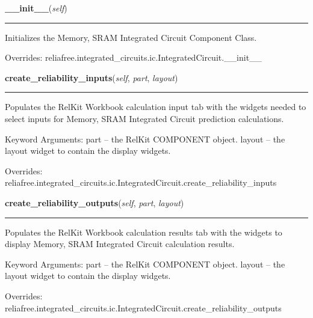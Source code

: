 \hspace{.8\funcindent}\begin{boxedminipage}{\funcwidth}

    \raggedright \textbf{\_\_init\_\_}(\textit{self})

    \vspace{-1.5ex}

    \rule{\textwidth}{0.5\fboxrule}
\setlength{\parskip}{2ex}
    Initializes the Memory, SRAM Integrated Circuit Component Class.

\setlength{\parskip}{1ex}
      Overrides: reliafree.integrated\_circuits.ic.IntegratedCircuit.\_\_init\_\_

    \end{boxedminipage}

    \vspace{0.5ex}

\hspace{.8\funcindent}\begin{boxedminipage}{\funcwidth}

    \raggedright \textbf{create\_reliability\_inputs}(\textit{self}, \textit{part}, \textit{layout})

    \vspace{-1.5ex}

    \rule{\textwidth}{0.5\fboxrule}
\setlength{\parskip}{2ex}
    Populates the RelKit Workbook calculation input tab with the widgets
    needed to select inputs for Memory, SRAM Integrated Circuit prediction 
    calculations.

    Keyword Arguments: part   -- the RelKit COMPONENT object. layout -- 
    the layout widget to contain the display widgets.

\setlength{\parskip}{1ex}
      Overrides: reliafree.integrated\_circuits.ic.IntegratedCircuit.create\_reliability\_inputs

    \end{boxedminipage}

    \vspace{0.5ex}

\hspace{.8\funcindent}\begin{boxedminipage}{\funcwidth}

    \raggedright \textbf{create\_reliability\_outputs}(\textit{self}, \textit{part}, \textit{layout})

    \vspace{-1.5ex}

    \rule{\textwidth}{0.5\fboxrule}
\setlength{\parskip}{2ex}
    Populates the RelKit Workbook calculation results tab with the 
    widgets to display Memory, SRAM Integrated Circuit calculation results.

    Keyword Arguments: part   -- the RelKit COMPONENT object. layout -- 
    the layout widget to contain the display widgets.

\setlength{\parskip}{1ex}
      Overrides: reliafree.integrated\_circuits.ic.IntegratedCircuit.create\_reliability\_outputs

    \end{boxedminipage}

